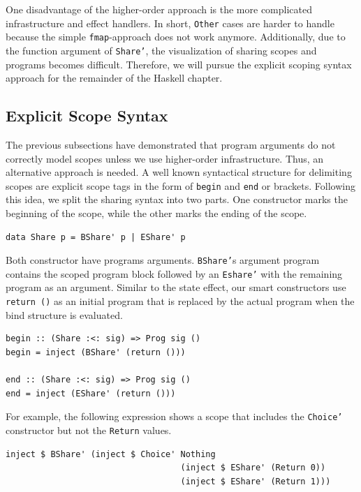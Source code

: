 \documentclass[a4paper, 11pt, fleqn, twoside]{scrreprt}
\newcommand{\hinl}[1]{\texttt{#1}}
\begin{document}
One disadvantage of the higher-order approach is the more complicated infrastructure and effect handlers.
In short, \hinl{Other} cases are harder to handle because the simple \hinl{fmap}-approach does not work anymore.
Additionally, due to the function argument of \hinl{Share'}, the visualization of sharing scopes and programs becomes difficult.
Therefore, we will pursue the explicit scoping syntax approach for the remainder of the Haskell chapter.

\subsection{Explicit Scope Syntax}
\label{subsec:explicit}
The previous subsections have demonstrated that program arguments do not correctly model scopes unless we use higher-order infrastructure.
Thus, an alternative approach is needed.
A well known syntactical structure for delimiting scopes are explicit scope tags in the form of \hinl{begin} and \hinl{end} or brackets.
Following this idea, we split the sharing syntax into two parts.
One constructor marks the beginning of the scope, while the other marks the ending of the scope.

\begin{verbatim}
data Share p = BShare' p | EShare' p
\end{verbatim}

Both constructor have programs arguments.
\hinl{BShare'}s argument program contains the scoped program block followed by an \hinl{Eshare'} with the remaining program as an argument.
Similar to the state effect, our smart constructors use \hinl{return ()} as an initial program that is replaced by the actual program when the bind structure is evaluated.

\begin{verbatim}
begin :: (Share :<: sig) => Prog sig ()
begin = inject (BShare' (return ()))

end :: (Share :<: sig) => Prog sig ()
end = inject (EShare' (return ()))
\end{verbatim}

For example, the following expression shows a scope that includes the \hinl{Choice'} constructor but not the \hinl{Return} values.

\begin{verbatim}
inject $ BShare' (inject $ Choice' Nothing 
                                   (inject $ EShare' (Return 0))
                                   (inject $ EShare' (Return 1)))
\end{verbatim}
\end{document}

